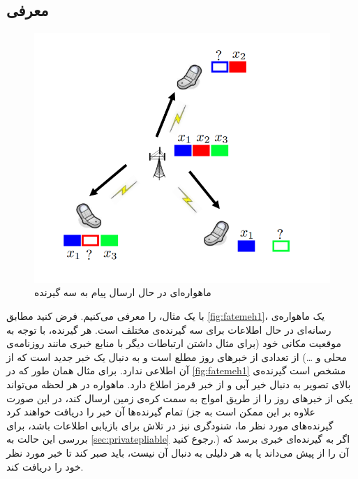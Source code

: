 \subsection{
	معرفی \icod
	}
	\begin{figure}
		\centering
		\includegraphics[width=1\linewidth]{figs/chapter1/fatemeh1}
		\caption[
					ماهواره‌ای در حال ارسال پیام به سه گیرنده
		]{
			ماهواره‌ای در حال ارسال پیام به سه گیرنده
			\cite{fatemehbook}
		}
		\label{fig:fatemeh1}
	\end{figure}
با یک مثال، \icod را معرفی می‌کنیم. فرض کنید مطابق 
\autoref{fig:fatemeh1}،
یک ماهواره‌‌ی رسانه‌ای در حال 
 اطلاعات برای سه گیرنده‌ی مختلف است. 
هر گیرنده، با توجه به موقعیت مکانی خود (برای مثال داشتن ارتباطات دیگر با منابع خبری مانند روزنامه‌ی محلی و \ldots) از تعدادی از خبرهای روز مطلع است و به دنبال یک خبر جدید است که از آن اطلاعی ندارد. برای مثال همان طور که در \autoref{fig:fatemeh1} مشخص است گیرنده‌ی بالای تصویر به دنبال خیر آبی و از خبر قرمز اطلاع دارد. ماهواره در هر لحظه می‌تواند یکی از خبرهای روز را از طریق امواج به سمت کره‌ی زمین ارسال کند، در این صورت تمام گیرنده‌ها آن خبر را دریافت خواهند کرد (علاوه بر این ممکن است به جز گیرنده‌های مورد نظر ما، شنودگری نیز در تلاش برای بازیابی اطلاعات باشد، برای بررسی این حالت به
\autoref{sec:privatepliable} 
رجوع کنید.) اگر به گیرنده‌ای خبری برسد که آن را از پیش می‌داند یا به هر دلیلی به دنبال آن نیست، باید صبر کند تا خبر مورد نظر خود را دریافت کند. 

